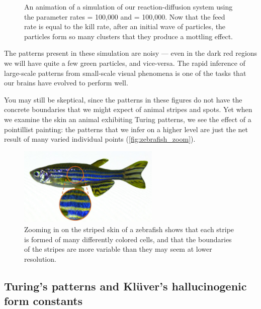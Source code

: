 \begin{figure}[h]
\begin{tabular}{c c c c}
\end{tabular}
\caption{An animation of a simulation of our reaction-diffusion system using the parameter rates  = 100,000 and  = 100,000. Now that the feed rate is equal to the kill rate, after an initial wave of  particles, the  particles form so many clusters that they produce a mottling effect.}
\label{fig:k=100000_f=100000}
\end{figure}

\FloatBarrier

The patterns present in these simulation are noisy --- even in the dark red regions we will have quite a few green particles, and vice-versa. The rapid inference of large-scale patterns from small-scale visual phenomena is one of the tasks that our brains have evolved to perform well.

You may still be skeptical, since the patterns in these figures do not have the concrete boundaries that we might expect of animal stripes and spots. Yet when we examine the skin an animal exhibiting Turing patterns, we see the effect of a pointillist painting: the patterns that we infer on a higher level are just the net result of many varied individual points (\autoref{fig:zebrafish_zoom}).\\

\begin{figure}[h]
\centering
\mySfFamily
\includegraphics[width = 0.6\textwidth]{../images_CMYK/zebrafish_zoom}
\caption{Zooming in on the striped skin of a zebrafish shows that each stripe is formed of many differently colored cells, and that the boundaries of the stripes are more variable than they may seem at lower resolution.}
\label{fig:zebrafish_zoom}
\end{figure}

\FloatBarrier
{}
\subsection{Turing's patterns and Klüver's hallucinogenic form constants}

